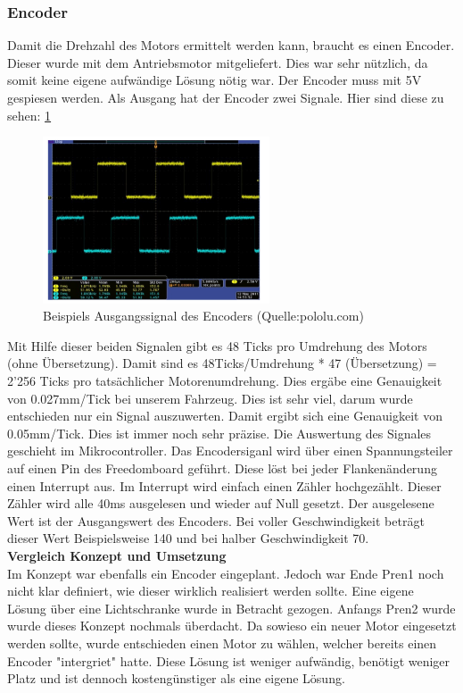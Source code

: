 \subsubsection{Encoder}
Damit die Drehzahl des Motors ermittelt werden kann, braucht es einen Encoder. Dieser wurde mit dem Antriebsmotor mitgeliefert. Dies war sehr nützlich, da somit keine eigene aufwändige Lösung nötig war. Der Encoder muss mit 5V gespiesen werden. Als Ausgang hat der Encoder zwei Signale. Hier sind diese zu sehen:
\ref{fig:encoder_out}
\begin{figure}[H]%
\centering
\includegraphics[width=0.6\textwidth]{03_Loesungskonzept/pictures/Encoder_Out.png}
\caption{Beispiels Ausgangssignal des Encoders (Quelle:pololu.com)}
\label{fig:encoder_out}
\end{figure}
Mit Hilfe dieser beiden Signalen gibt es 48 Ticks pro Umdrehung des Motors (ohne Übersetzung). Damit sind es 48Ticks/Umdrehung * 47 (Übersetzung) = 2'256 Ticks pro tatsächlicher Motorenumdrehung. Dies ergäbe eine Genauigkeit von 0.027mm/Tick bei unserem Fahrzeug. Dies ist sehr viel, darum wurde entschieden nur ein Signal auszuwerten. Damit ergibt sich eine Genauigkeit von 0.05mm/Tick. Dies ist immer noch sehr präzise.
Die Auswertung des Signales geschieht im Mikrocontroller. Das Encodersiganl wird über einen Spannungsteiler auf einen Pin des Freedomboard geführt. Diese löst bei jeder Flankenänderung einen Interrupt aus. Im Interrupt wird einfach einen Zähler hochgezählt. Dieser Zähler wird alle 40ms ausgelesen und wieder auf Null gesetzt. Der ausgelesene Wert ist der Ausgangswert des Encoders. Bei voller Geschwindigkeit beträgt dieser Wert Beispielsweise 140 und bei halber Geschwindigkeit 70.\\[0.2cm]
\textbf{Vergleich Konzept und Umsetzung}\\[0.2cm]
Im Konzept war ebenfalls ein Encoder eingeplant. Jedoch war Ende Pren1 noch nicht klar definiert, wie dieser wirklich realisiert werden sollte. Eine eigene Lösung über eine Lichtschranke wurde in Betracht gezogen. Anfangs Pren2 wurde wurde dieses Konzept nochmals überdacht. Da sowieso ein neuer Motor eingesetzt werden sollte, wurde entschieden einen Motor zu wählen, welcher bereits einen Encoder "intergriet" hatte. Diese Lösung ist weniger aufwändig, benötigt weniger Platz und ist dennoch kostengünstiger als eine eigene Lösung.\\[0.2cm]
